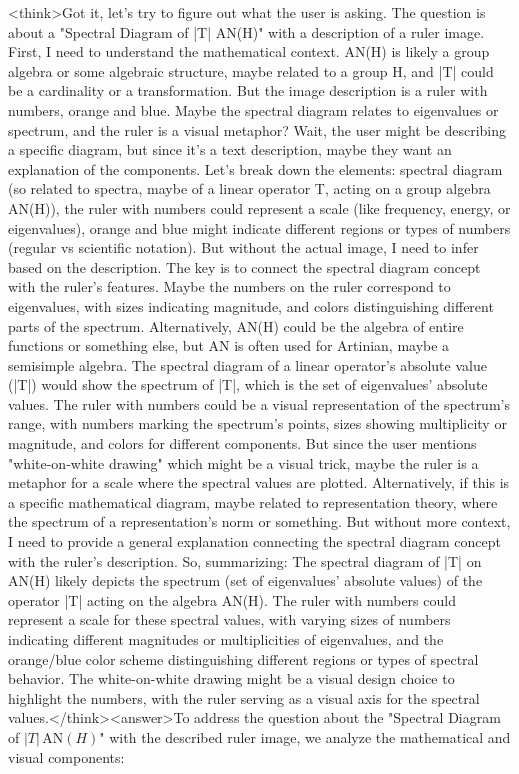 <think>Got it, let's try to figure out what the user is asking. The question is about a "Spectral Diagram of |T| AN(H)" with a description of a ruler image. First, I need to understand the mathematical context. AN(H) is likely a group algebra or some algebraic structure, maybe related to a group H, and |T| could be a cardinality or a transformation. But the image description is a ruler with numbers, orange and blue. Maybe the spectral diagram relates to eigenvalues or spectrum, and the ruler is a visual metaphor? Wait, the user might be describing a specific diagram, but since it's a text description, maybe they want an explanation of the components. Let's break down the elements: spectral diagram (so related to spectra, maybe of a linear operator T, acting on a group algebra AN(H)), the ruler with numbers could represent a scale (like frequency, energy, or eigenvalues), orange and blue might indicate different regions or types of numbers (regular vs scientific notation). But without the actual image, I need to infer based on the description. The key is to connect the spectral diagram concept with the ruler's features. Maybe the numbers on the ruler correspond to eigenvalues, with sizes indicating magnitude, and colors distinguishing different parts of the spectrum. Alternatively, AN(H) could be the algebra of entire functions or something else, but AN is often used for Artinian, maybe a semisimple algebra. The spectral diagram of a linear operator's absolute value (|T|) would show the spectrum of |T|, which is the set of eigenvalues' absolute values. The ruler with numbers could be a visual representation of the spectrum's range, with numbers marking the spectrum's points, sizes showing multiplicity or magnitude, and colors for different components. But since the user mentions "white-on-white drawing" which might be a visual trick, maybe the ruler is a metaphor for a scale where the spectral values are plotted. Alternatively, if this is a specific mathematical diagram, maybe related to representation theory, where the spectrum of a representation's norm or something. But without more context, I need to provide a general explanation connecting the spectral diagram concept with the ruler's description. So, summarizing: The spectral diagram of |T| on AN(H) likely depicts the spectrum (set of eigenvalues' absolute values) of the operator |T| acting on the algebra AN(H). The ruler with numbers could represent a scale for these spectral values, with varying sizes of numbers indicating different magnitudes or multiplicities of eigenvalues, and the orange/blue color scheme distinguishing different regions or types of spectral behavior. The white-on-white drawing might be a visual design choice to highlight the numbers, with the ruler serving as a visual axis for the spectral values.</think><answer>To address the question about the "Spectral Diagram of \( |T| \, \text{AN}(H) \)" with the described ruler image, we analyze the mathematical and visual components:  

